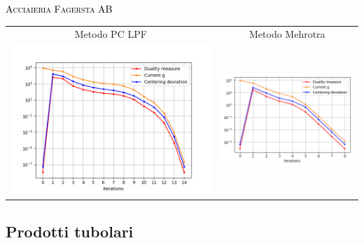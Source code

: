 \begin{frame}{\textsc{\LARGE \textcolor{black}{Acciaieria Fagersta AB}}}
	\centering
	\begin{tabular}{c@{}c}
		\small{Metodo PC LPF} & \small{Metodo Mehrotra} \\
		\includegraphics[scale = 0.33]{swe_PCLPF}
		&\includegraphics[scale = 0.33]{swe_MER}\\ 
	\end{tabular}
\end{frame}

\subsection{Prodotti tubolari}


